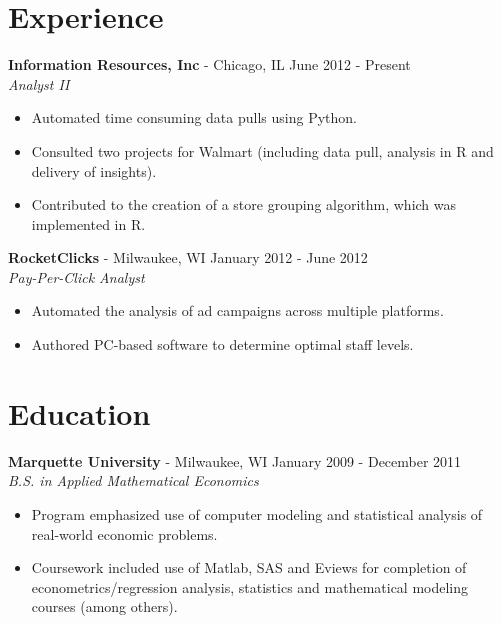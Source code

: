 \documentclass[margin]{res}
\begin{document}
\address{Chicago, IL 60640\\  (847) 909-6486}
\address{www.rhostats.com\\ mrhodes262@gmail.com}


\begin{resume}

\section{Experience}
 {\bf Information Resources, Inc} - Chicago, IL \hfill June 2012 - Present\\
 \textit{Analyst II}
 \begin{itemize} \itemsep -2pt  %
	\item Automated time consuming data pulls using Python.
 	\item Consulted two projects for Walmart (including data pull, analysis in R and delivery of insights).
 	\item Contributed to the creation of a store grouping algorithm, which was implemented in R.
 \end{itemize}
 
 {\bf RocketClicks} - Milwaukee, WI \hfill January 2012 - June 2012\\
 \textit{Pay-Per-Click Analyst}
 \begin{itemize} \itemsep -2pt  %
 	\item Automated the analysis of ad campaigns across multiple platforms.
 	\item Authored PC-based software to determine optimal staff levels.
 \end{itemize}
 
\section{Education} 
\textbf{Marquette University} - Milwaukee, WI \hfill January 2009 - December 2011 \\
\textit{B.S. in Applied Mathematical Economics}

\begin{itemize} \itemsep -2pt  %
	\item Program emphasized use of computer modeling and statistical analysis of real-world economic problems.
 	\item Coursework included use of Matlab, SAS and Eviews for completion of econometrics/regression analysis, statistics and mathematical modeling courses (among others).
\end{itemize}


\end{resume}
\end{document}
